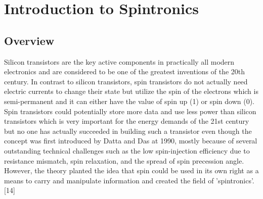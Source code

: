\documentclass{article}
\begin{document}
\pagebreak
\section{Introduction to Spintronics}
\subsection{Overview}
Silicon transistors are the key active components in practically all modern electronics and are considered to be one of the greatest inventions of the 20th century.  In contrast to silicon transistors, spin transistors do not actually need electric currents to change their state but utilize the spin of the electrons which is semi-permanent and it can either have the value of spin up (1) or spin down (0). Spin transistors could potentially store more data and use less power than silicon transistors which is very important for the energy demands of the 21st century but no one has actually succeeded in building such a transistor even though the concept was first introduced by Datta and Das at 1990, mostly because of several outstanding technical challenges such as the low spin-injection efficiency due to resistance mismatch, spin relaxation, and the spread of spin precession angle. However, the theory planted the idea that spin could be used in its own right as a means to carry and manipulate information and created the field of 'spintronics'.[14]
\end{document}
